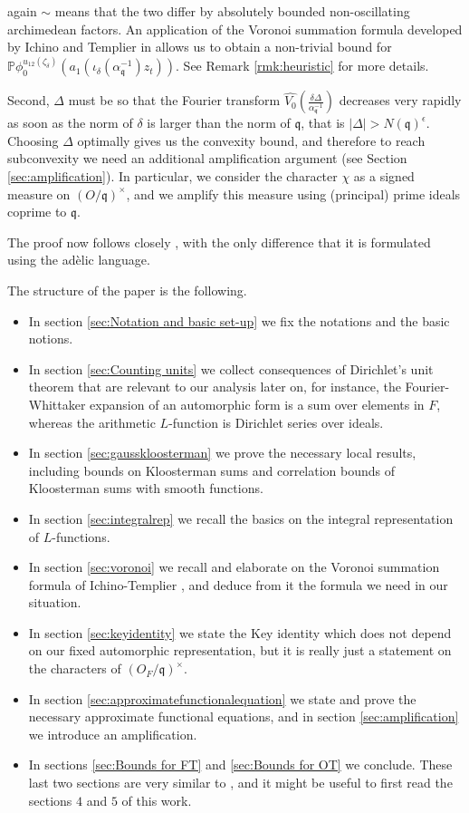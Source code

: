 \documentclass[a4paper,11pt]{amsart}
\theoremstyle{definition}
\begin{document}
again $\sim$ means that the two differ by absolutely bounded non-oscillating archimedean factors. An application of the Voronoi summation formula developed by Ichino and Templier in \cite{IchinoTemplier} allows us to obtain a non-trivial bound for $\mathbb{P}\phi_0^{u_{12}(\zeta_\delta)}(a_1(\iota_\delta(\alpha_\mathfrak{q}^{-1})z_t))$. See Remark \ref{rmk:heuristic} for more details.

Second, $\Delta$ must be so that the Fourier transform $\widehat{V_0}\left(\frac{\delta \Delta}{\alpha_\mathfrak{q}^{-1}}\right)$ decreases very rapidly as soon as the norm of $\delta$ is larger than the norm of $\mathfrak{q}$, that is $\vert \Delta \vert > N(\mathfrak{q})^\epsilon$. Choosing $\Delta$ optimally gives us the convexity bound, and therefore to reach subconvexity we need an additional amplification argument (see Section \ref{sec:amplification}). In particular, we consider the character $\chi$ as a signed measure on $(O/\mathfrak{q})^\times$, and we amplify this measure using (principal) prime ideals coprime to $\mathfrak{q}$.


The proof now follows closely \cite{nelsonholowinsky}, with the only difference that it is formulated using the adèlic language. 


The structure of the paper is the following. \begin{itemize}
    \item In section \ref{sec:Notation and basic set-up} we fix the notations and the basic notions. 
    \item In section \ref{sec:Counting units}  we collect consequences of Dirichlet's unit theorem that are relevant to our analysis later on, for instance, the Fourier-Whittaker expansion of an automorphic form is a sum over elements in $F$, whereas the arithmetic $L$-function is Dirichlet series over ideals. 
\item In section \ref{sec:gausskloosterman} we prove the necessary local results, including bounds on Kloosterman sums and correlation bounds of Kloosterman sums with smooth functions. 
\item In section \ref{sec:integralrep} we recall the basics on the integral representation of $L$-functions. \item In section \ref{sec:voronoi} we recall and elaborate on the Voronoi summation formula of Ichino-Templier \cite{IchinoTemplier}, and deduce from it the formula we need in our situation. \item In section \ref{sec:keyidentity} we state the Key identity which does not depend on our fixed automorphic representation, but it is really just a statement on the characters of $(O_F/\mathfrak{q})^\times$. \item In section \ref{sec:approximatefunctionalequation} we state and prove the necessary approximate functional equations, and in section \ref{sec:amplification} we introduce an amplification. \item In sections \ref{sec:Bounds for FT} and \ref{sec:Bounds for OT} we conclude. These last two sections are very similar to \cite{nelsonholowinsky}, and it might be useful to first read the sections $4$ and $5$ of this work. 
\end{itemize}
\end{document}
